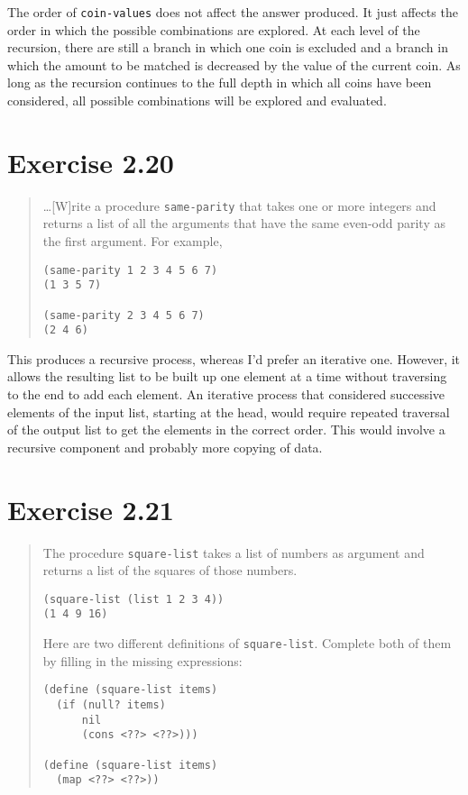 \documentclass{article}
\begin{document}


The order of \texttt{coin-values} does not affect the answer produced. It just
affects the order in which the possible combinations are explored. At each level
of the recursion, there are still a branch in which one coin is excluded and a
branch in which the amount to be matched is decreased by the value of the
current coin. As long as the recursion continues to the full depth in which all
coins have been considered, all possible combinations will be explored and
evaluated.

\section{Exercise 2.20}
\begin{quote}
    \ldots[W]rite a procedure \texttt{same-parity} that takes one or more
    integers and returns a list of all the arguments that have the same
    even-odd parity as the first argument. For example,
    \begin{lstlisting}
(same-parity 1 2 3 4 5 6 7)
(1 3 5 7)

(same-parity 2 3 4 5 6 7)
(2 4 6)
    \end{lstlisting}
\end{quote}



This produces a recursive process, whereas I'd prefer an iterative one.
However, it allows the resulting list to be built up one element at a time
without traversing to the end to add each element. An iterative process that
considered successive elements of the input list, starting at the head, would
require repeated traversal of the output list to get the elements in the correct
order. This would involve a recursive component and probably more copying of
data.

\section{Exercise 2.21}
\begin{quote}
    The procedure \texttt{square-list} takes a list of numbers as argument and
    returns a list of the squares of those numbers.
    \begin{lstlisting}
(square-list (list 1 2 3 4))
(1 4 9 16)
    \end{lstlisting}
    Here are two different definitions of \texttt{square-list}. Complete both
    of them by filling in the missing expressions:
    \begin{lstlisting}
(define (square-list items)
  (if (null? items)
      nil
      (cons <??> <??>)))

(define (square-list items)
  (map <??> <??>))
    \end{lstlisting}
\end{quote}



\end{document}
